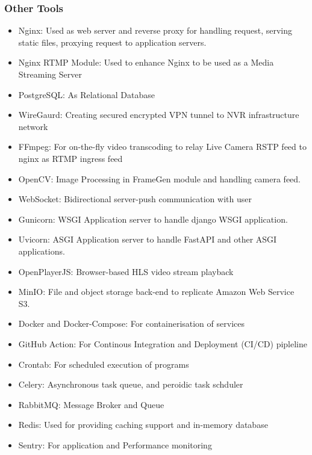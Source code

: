 \subsubsection*{Other Tools}
\begin{itemize}
	\item Nginx: Used as web server and reverse proxy for handling request, serving static files, proxying request to application servers.
	\item Nginx RTMP Module: Used to enhance Nginx to be used as a Media Streaming Server
	\item PostgreSQL: As Relational Database
	\item WireGaurd: Creating secured encrypted VPN tunnel to NVR infrastructure network
	\item FFmpeg: For on-the-fly video transcoding to relay Live Camera RSTP feed to nginx as RTMP ingress feed
	\item OpenCV: Image Processing in FrameGen module and handling camera feed.
	\item WebSocket: Bidirectional server-push communication with user
	\item Gunicorn: WSGI Application server to handle django WSGI application.
	\item Uvicorn: ASGI Application server to handle FastAPI and other ASGI applications. 
	\item OpenPlayerJS: Browser-based HLS video stream playback
	\item MinIO: File and object storage back-end to replicate Amazon Web Service S3.		%
	\item Docker and Docker-Compose: For containerisation of services
	\item GitHub Action: For Continous Integration and Deployment (CI/CD) pipleline
	\item Crontab: For scheduled execution of programs
	\item Celery: Asynchronous task queue, and peroidic task schduler
	\item RabbitMQ: Message Broker and Queue
	\item Redis: Used for providing caching support and in-memory database
	\item Sentry: For application and Performance monitoring
\end{itemize}